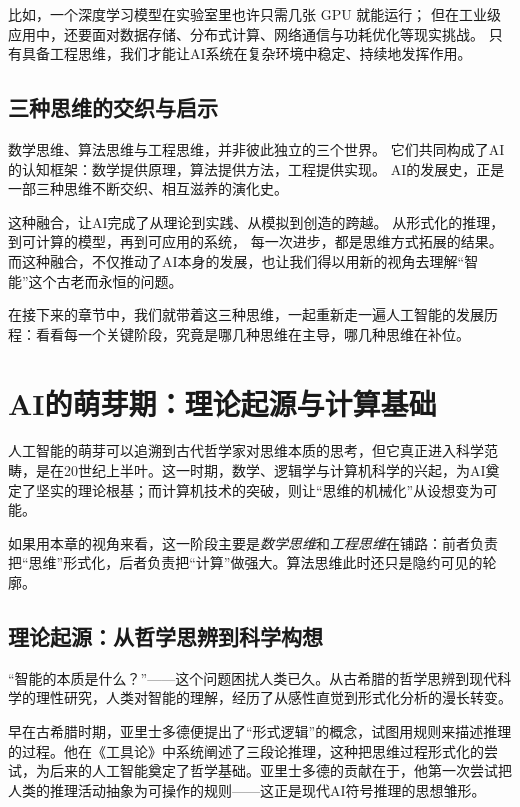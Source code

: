 比如，一个深度学习模型在实验室里也许只需几张 GPU 就能运行；  
但在工业级应用中，还要面对数据存储、分布式计算、网络通信与功耗优化等现实挑战。  
只有具备工程思维，我们才能让AI系统在复杂环境中稳定、持续地发挥作用。

\subsection{三种思维的交织与启示}

数学思维、算法思维与工程思维，并非彼此独立的三个世界。  
它们共同构成了AI的认知框架：数学提供原理，算法提供方法，工程提供实现。  
AI的发展史，正是一部三种思维不断交织、相互滋养的演化史。

这种融合，让AI完成了从理论到实践、从模拟到创造的跨越。  
从形式化的推理，到可计算的模型，再到可应用的系统，  
每一次进步，都是思维方式拓展的结果。  
而这种融合，不仅推动了AI本身的发展，也让我们得以用新的视角去理解“智能”这个古老而永恒的问题。

在接下来的章节中，我们就带着这三种思维，一起重新走一遍人工智能的发展历程：看看每一个关键阶段，究竟是哪几种思维在主导，哪几种思维在补位。

\section{AI的萌芽期：理论起源与计算基础}

人工智能的萌芽可以追溯到古代哲学家对思维本质的思考，但它真正进入科学范畴，是在20世纪上半叶。这一时期，数学、逻辑学与计算机科学的兴起，为AI奠定了坚实的理论根基；而计算机技术的突破，则让“思维的机械化”从设想变为可能。

如果用本章的视角来看，这一阶段主要是\emph{数学思维}和\emph{工程思维}在铺路：前者负责把“思维”形式化，后者负责把“计算”做强大。算法思维此时还只是隐约可见的轮廓。

\subsection{理论起源：从哲学思辨到科学构想}

“智能的本质是什么？”——这个问题困扰人类已久。从古希腊的哲学思辨到现代科学的理性研究，人类对智能的理解，经历了从感性直觉到形式化分析的漫长转变。

早在古希腊时期，亚里士多德便提出了“形式逻辑”的概念，试图用规则来描述推理的过程。他在《工具论》中系统阐述了三段论推理，这种把思维过程形式化的尝试，为后来的人工智能奠定了哲学基础。亚里士多德的贡献在于，他第一次尝试把人类的推理活动抽象为可操作的规则——这正是现代AI符号推理的思想雏形。

